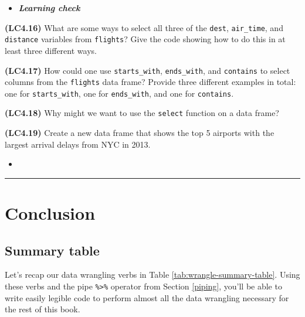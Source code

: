 \documentclass[12pt, krantz2,]{krantz}
\newenvironment{rmdblock}[1]
  {\begin{shaded*}
  \begin{itemize}
  \renewcommand{\labelitemi}{
    \raisebox{-.7\height}[0pt][0pt]{
    }
  }
  \item
  }
  {
  \end{itemize}
  \end{shaded*}
  }
\newenvironment{learncheck}
  {\begin{rmdblock}{warning}}
  {\end{rmdblock}}
\begin{document}
\begin{learncheck}
\textbf{\emph{Learning check}}
\end{learncheck}

\textbf{(LC4.16)} What are some ways to select all three of the \texttt{dest}, \texttt{air\_time}, and \texttt{distance} variables from \texttt{flights}? Give the code showing how to do this in at least three different ways.

\textbf{(LC4.17)} How could one use \texttt{starts\_with}, \texttt{ends\_with}, and \texttt{contains} to select columns from the \texttt{flights} data frame? Provide three different examples in total: one for \texttt{starts\_with}, one for \texttt{ends\_with}, and one for \texttt{contains}.

\textbf{(LC4.18)} Why might we want to use the \texttt{select} function on a data frame?

\textbf{(LC4.19)} Create a new data frame that shows the top 5 airports with the largest arrival delays from NYC in 2013.

\begin{learncheck}

\end{learncheck}

\begin{center}\rule{0.5\linewidth}{\linethickness}\end{center}

\hypertarget{conclusion-2}{%
\section{Conclusion}\label{conclusion-2}}

\hypertarget{summary-table-1}{%
\subsection{Summary table}\label{summary-table-1}}

Let's recap our data wrangling verbs in Table \ref{tab:wrangle-summary-table}. Using these verbs and the pipe \texttt{\%\textgreater{}\%} operator from Section \ref{piping}, you'll be able to write easily legible code to perform almost all the data wrangling necessary for the rest of this book.
\end{document}

